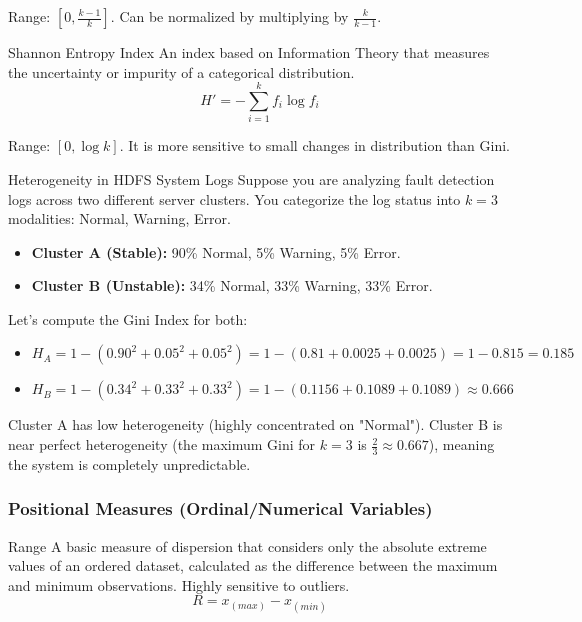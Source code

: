 Range: $[0, \frac{k-1}{k}]$. Can be normalized by multiplying by $\frac{k}{k-1}$.

\begin{defbox}{Shannon Entropy Index}
An index based on Information Theory that measures the uncertainty or impurity of a categorical distribution.
\begin{equation}
    H' = -\sum_{i=1}^{k} f_i \log f_i
\end{equation}

\end{defbox}

Range: $[0, \log k]$. It is more sensitive to small changes in distribution than Gini.

\vspace{0.2cm}
\begin{example}{Heterogeneity in HDFS System Logs}
Suppose you are analyzing fault detection logs across two different server clusters. You categorize the log status into $k=3$ modalities: Normal, Warning, Error.

\begin{itemize}
    \item \textbf{Cluster A (Stable):} 90\% Normal, 5\% Warning, 5\% Error.
    \item \textbf{Cluster B (Unstable):} 34\% Normal, 33\% Warning, 33\% Error.
\end{itemize}

Let's compute the Gini Index for both:
\begin{itemize}
    \item $H_A = 1 - (0.90^2 + 0.05^2 + 0.05^2) = 1 - (0.81 + 0.0025 + 0.0025) = 1 - 0.815 = 0.185$
    \item $H_B = 1 - (0.34^2 + 0.33^2 + 0.33^2) = 1 - (0.1156 + 0.1089 + 0.1089) \approx 0.666$
\end{itemize}
Cluster A has low heterogeneity (highly concentrated on "Normal"). Cluster B is near perfect heterogeneity (the maximum Gini for $k=3$ is $\frac{2}{3} \approx 0.667$), meaning the system is completely unpredictable.
\end{example}

\subsubsection{Positional Measures (Ordinal/Numerical Variables)}

\begin{defbox}{Range}
A basic measure of dispersion that considers only the absolute extreme values of an ordered dataset, calculated as the difference between the maximum and minimum observations. Highly sensitive to outliers.
\begin{equation}
    R = x_{(max)} - x_{(min)}
\end{equation}
\end{defbox}

